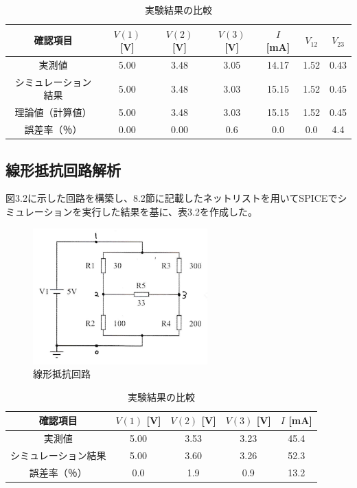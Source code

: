 \documentclass{jlreq}
\numberwithin{equation}{section}
\begin{document}
\begin{table}[H]
  \centering
  \caption{実験結果の比較}
  \begin{tabular}{|c|c|c|c|c|c|c|}
    \hline
    確認項目 & \( V(1) \) [V] & \( V(2) \) [V] & \( V(3) \) [V] & \( I \) [mA] & \( V_{12} \) & \( V_{23} \) \\ \hline
    実測値 & 5.00 & 3.48 & 3.05 & 14.17 & 1.52 & 0.43 \\ \hline
    シミュレーション結果 & 5.00 & 3.48 & 3.03 & 15.15 & 1.52 & 0.45 \\ \hline
    理論値（計算値） & 5.00 & 3.48 & 3.03 & 15.15 & 1.52 & 0.45 \\ \hline
    誤差率（％） & 0.00 & 0.00 & 0.6 & 0.0 & 0.0 & 4.4 \\ \hline
  \end{tabular}
\end{table}

\subsection{線形抵抗回路解析}
図3.2に示した回路を構築し、8.2節に記載したネットリストを用いてSPICEでシミュレーションを実行した結果を基に、表3.2を作成した。

\begin{figure}[H]
  \centering
  \includegraphics[width=0.6\textwidth]{assets/senkeikairo.png}
  \caption{線形抵抗回路}
\end{figure}

\begin{table}[H]
  \centering
  \caption{実験結果の比較}
  \begin{tabular}{|c|c|c|c|c|}
    \hline
    確認項目 & \( V(1) \) [V] & \( V(2) \) [V] & \( V(3) \) [V] & \( I \) [mA] \\ \hline
    実測値 & 5.00 & 3.53 & 3.23 & 45.4 \\ \hline
    シミュレーション結果 & 5.00 & 3.60 & 3.26 & 52.3 \\ \hline
    誤差率（％） & 0.0 & 1.9 & 0.9 & 13.2 \\ \hline
  \end{tabular}
\end{table}
\end{document}
